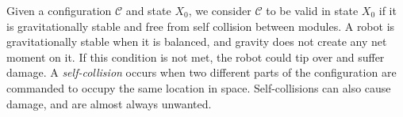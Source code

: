 \documentclass[graybox]{svmult}
\newcommand{\TODO}[1]{ {\bf \textcolor{red}{TODO:} #1 }}
\begin{document}
Given a configuration $\mathcal{C}$ and state \(X_0\), we consider $\mathcal{C}$ to be valid in state \(X_0\) if it is gravitationally stable and free from self
collision between modules.  A robot is gravitationally
stable when it is balanced, and gravity does not create any net moment on it.
If this condition is not met, the robot could tip over and suffer damage.
%
A \textit{self-collision}
occurs when two different parts of the configuration are commanded to occupy the
same location in space.  Self-collisions can also cause damage, and are almost
always unwanted.



\end{document}
